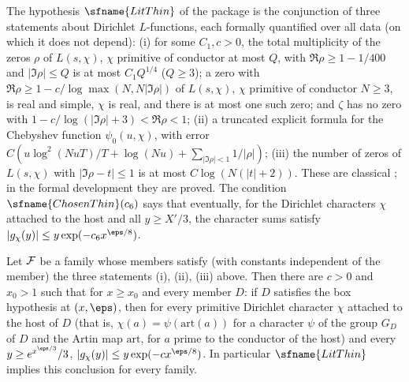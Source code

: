 The hypothesis $\sfname{LitThin}$ of the package is the conjunction of three statements about Dirichlet
$L$-functions, each formally quantified over all data (on which it does not depend): (i) for some $C_1,c>0$, the total
multiplicity of the zeros $\rho$ of $L(s,\chi)$, $\chi$ primitive of conductor at most $Q$, with $\Re\rho\ge1-1/400$ and
$|\Im\rho|\le Q$ is at most $C_1Q^{1/4}$ ($Q\ge3$); a zero with $\Re\rho\ge1-c/\log\max(N,N|\Im\rho|)$ of $L(s,\chi)$,
$\chi$ primitive of conductor $N\ge3$, is real and simple, $\chi$ is real, and there is at most one such zero; and
$\zeta$ has no zero with $1-c/\log(|\Im\rho|+3)<\Re\rho<1$; (ii) a truncated explicit formula for the
Chebyshev function $\psi_0(u,\chi)$, with error $C(u\log^2(NuT)/T+\log(Nu)+\sum_{|\Im\rho|<1}1/|\rho|)$; (iii) the
number of zeros of $L(s,\chi)$ with $|\Im\rho-t|\le1$ is at most $C\log(N(|t|+2))$. These are classical
\cite{Davenport2000,Montgomery1971}; in the formal development they are proved. The condition
$\sfname{ChosenThin}(c_6)$ says that eventually, for the Dirichlet characters $\chi$ attached to the host and all
$y\ge X'/3$, the character sums satisfy $|g_\chi(y)|\le y\exp(-c_6x^{\eps/8})$.

\begin{proposition}\label{pf:top-shape:thin}
Let $\mathcal{F}$ be a family whose members satisfy (with constants independent of the member) the three statements
(i), (ii), (iii) above. Then there are $c>0$ and $x_0>1$ such that for $x\ge x_0$ and every member $D$: if $D$ satisfies
the box hypothesis at $(x,\eps)$, then for every primitive Dirichlet character $\chi$ attached to the host of $D$ (that
is, $\chi(a)=\psi(\mathrm{art}(a))$ for a character $\psi$ of the group $G_D$ of $D$ and the Artin map $\mathrm{art}$, for
$a$ prime to the conductor of the host) and every $y\ge e^{x^{\eps/3}}/3$, $|g_\chi(y)|\le y\exp(-cx^{\eps/8})$. In particular $\sfname{LitThin}$
implies this conclusion for every family.
\end{proposition}

